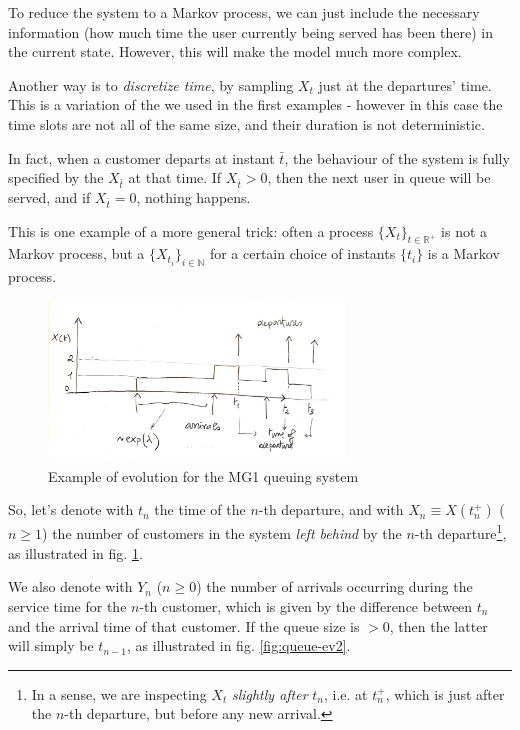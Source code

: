 \documentclass[../template.tex]{subfiles}
\begin{document}
To reduce the system to a Markov process, we can just include the necessary information (how much time the user currently being served has been there) in the current state. However, this will make the model much more complex.

\medskip

Another way is to \textit{discretize time}, by sampling $X_t$ just at the departures' time. This is a variation of the  we used in the first examples - however in this case the time slots are not all of the same size, and their duration is not deterministic. 

In fact, when a customer departs at instant $\bar{t}$, the behaviour of the system is fully specified by the $X_{\bar{t}}$ at that time. If $X_{\bar{t}} > 0$, then the next user in queue will be served, and if $X_{\bar{t}} = 0$, nothing happens.

\medskip

This is one example of a more general trick: often a process $\{X_t\}_{t \in \mathbb{R}^+}$ is not a Markov process, but a  $\{X_{t_i}\}_{i\in \mathbb{N}}$ for a certain  choice of instants $\{t_i\}$ is a Markov process.

\begin{figure}[htp]
    \centering
    \includegraphics[width=0.7\textwidth]{MG1-graph1.jpeg}
    \caption{Example of evolution for the MG1 queuing system\label{fig:queue-ev1}} 
\end{figure}

So, let's denote with $t_n$ the time of the $n$-th departure, and with $X_n \equiv X(t_n^+)$ ($n \geq 1$) the number of customers in the system \textit{left behind} by the $n$-th departure\footnote{In a sense, we are inspecting $X_t$ \textit{slightly after} $t_n$, i.e. at $t_n^+$, which is just after the $n$-th departure, but before any new arrival.}, as illustrated in fig. \ref{fig:queue-ev1}.

\medskip

We also denote with $Y_n$ ($n \geq 0$) the number of arrivals occurring during the service time for the $n$-th customer, which is given by the difference between $t_n$ and the arrival time of that customer. If the queue size is $>0$, then the latter will simply be $t_{n-1}$, as illustrated in fig. \ref{fig:queue-ev2}.
\end{document}
